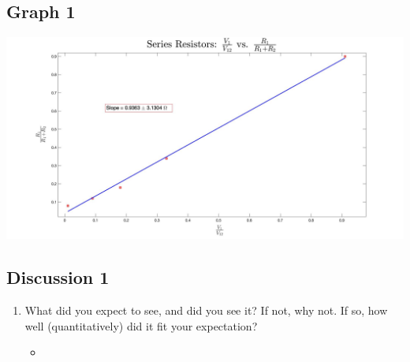 \documentclass{article}
\begin{document}
\begin{table}[!htp]
\begin{center}
    \subsection*{Graph 1}
    \includegraphics[scale=0.23]{series.jpg}
    \subsection*{Discussion 1}
    \begin{enumerate}
      \item What did you expect to see, and did you see it? If not, why not. If so, how well (quantitatively) did it fit your expectation?
      \begin{itemize}
        \item
      \end{itemize}
    \end{enumerate}
  \end{center}
\end{table}
\newpage
\end{document}
